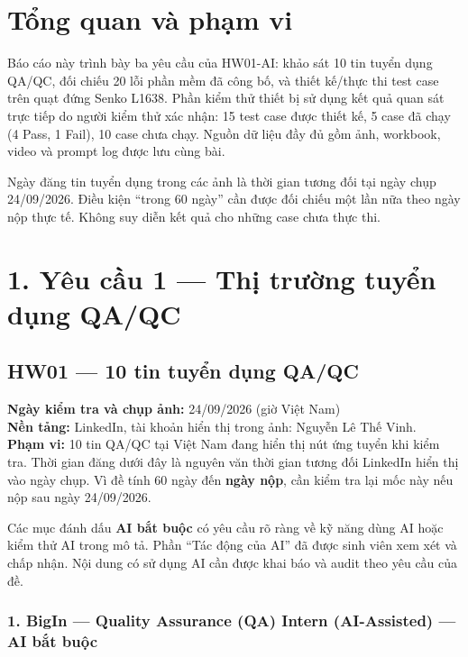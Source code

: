 \section{Tổng quan và phạm vi}\label{overview}

Báo cáo này trình bày ba yêu cầu của HW01-AI: khảo sát 10 tin tuyển dụng QA/QC, đối chiếu 20 lỗi phần mềm đã công bố, và thiết kế/thực thi test case trên quạt đứng Senko L1638. Phần kiểm thử thiết bị sử dụng kết quả quan sát trực tiếp do người kiểm thử xác nhận: 15 test case được thiết kế, 5 case đã chạy (4 Pass, 1 Fail), 10 case chưa chạy. Nguồn dữ liệu đầy đủ gồm ảnh, workbook, video và prompt log được lưu cùng bài.

Ngày đăng tin tuyển dụng trong các ảnh là thời gian tương đối tại ngày chụp 24/09/2026. Điều kiện ``trong 60 ngày'' cần được đối chiếu một lần nữa theo ngày nộp thực tế. Không suy diễn kết quả cho những case chưa thực thi.

\section{1. Yêu cầu 1 --- Thị trường tuyển dụng QA/QC}\label{jobs}

\subsection{HW01 --- 10 tin tuyển dụng QA/QC}\label{hw01-10-tin-tuyux1ec3n-dux1ee5ng-qaqc}

\textbf{Ngày kiểm tra và chụp ảnh:} 24/09/2026 (giờ Việt Nam)\\
\textbf{Nền tảng:} LinkedIn, tài khoản hiển thị trong ảnh: Nguyễn Lê Thế Vinh.\\
\textbf{Phạm vi:} 10 tin QA/QC tại Việt Nam đang hiển thị nút ứng tuyển khi kiểm tra. Thời gian đăng dưới đây là nguyên văn thời gian tương đối LinkedIn hiển thị vào ngày chụp. Vì đề tính 60 ngày đến \textbf{ngày nộp}, cần kiểm tra lại mốc này nếu nộp sau ngày 24/09/2026.

Các mục đánh dấu \textbf{AI bắt buộc} có yêu cầu rõ ràng về kỹ năng dùng AI hoặc kiểm thử AI trong mô tả. Phần ``Tác động của AI'' đã được sinh viên xem xét và chấp nhận. Nội dung có sử dụng AI cần được khai báo và audit theo yêu cầu của đề.

\subsubsection{1. BigIn --- Quality Assurance (QA) Intern (AI-Assisted) --- AI bắt buộc}\label{bigin-quality-assurance-qa-intern-ai-assisted-ai-bux1eaft-buux1ed9c}

